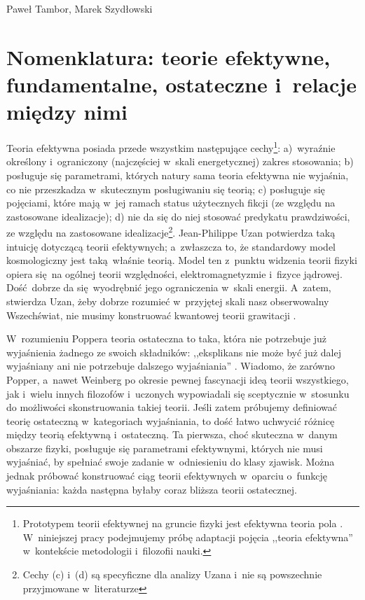 \begin{artplenv2auth}{Paweł Tambor, Marek Szydłowski}
\section{Nomenklatura: teorie efektywne, fundamentalne, ostateczne i~relacje między nimi}
Teoria efektywna posiada przede wszystkim następujące cechy\footnote{Prototypem teorii efektywnej na gruncie fizyki jest efektywna teoria pola
\parencites[][]{kim_wilson_1998}[][]{wilson_renormalization_1971}. %
 W~niniejszej pracy podejmujemy próbę adaptacji pojęcia ,,teoria efektywna'' w~kontekście metodologii i~filozofii nauki.}:
 a)~wyraźnie określony i~ograniczony (najczęściej w~skali energetycznej) zakres stosowania; b) posługuje się parametrami, których natury sama teoria efektywna nie wyjaśnia, co nie przeszkadza w~skutecznym posługiwaniu się teorią; c) posługuje się pojęciami, które mają w~jej ramach status użytecznych fikcji (ze względu na zastosowane idealizacje); d) nie da się do niej stosować predykatu prawdziwości, ze względu na zastosowane idealizacje\footnote{Cechy (c) i~(d) są specyficzne dla analizy Uzana i~nie są powszechnie przyjmowane w~literaturze}. Jean-Philippe Uzan potwierdza taką intuicję dotyczącą teorii efektywnych; a~zwłaszcza to, że standardowy model kosmologiczny jest taką~właśnie teorią. Model ten z~punktu widzenia teorii fizyki opiera się~na ogólnej teorii względności, elektromagnetyzmie i~fizyce jądrowej. Dość~dobrze da się~wyodrębnić jego ograniczenia w~skali energii. A~zatem, stwierdza Uzan, żeby dobrze rozumieć w~przyjętej skali nasz obserwowalny Wszechświat, nie musimy konstruować kwantowej teorii grawitacji 
\parencite[][s.~109]{uzan_emergent_2017}.%


W~rozumieniu Poppera teoria ostateczna to taka, która nie potrzebuje już wyjaśnienia żadnego ze swoich składników: ,,eksplikans nie może być już dalej wyjaśniany ani nie potrzebuje dalszego wyjaśniania''
\parencite[][s.~159]{popper_wiedza_2002}. %
 Wiadomo, że zarówno Popper, a~nawet Weinberg po okresie pewnej fascynacji ideą teorii wszystkiego, jak i~wielu innych filozofów i~uczonych wypowiadali się sceptycznie w~stosunku do możliwości skonstruowania takiej teorii. Jeśli zatem próbujemy definiować teorię ostateczną w~kategoriach wyjaśniania, to dość łatwo uchwycić różnicę między teorią efektywną i~ostateczną. Ta pierwsza, choć skuteczna w~danym obszarze fizyki, posługuje się parametrami efektywnymi, których nie musi wyjaśniać, by spełniać swoje zadanie w~odniesieniu do klasy zjawisk. Można jednak próbować konstruować ciąg teorii efektywnych w~oparciu o~funkcję wyjaśniania: każda następna byłaby coraz bliższa teorii ostatecznej.


\end{artplenv2auth}
